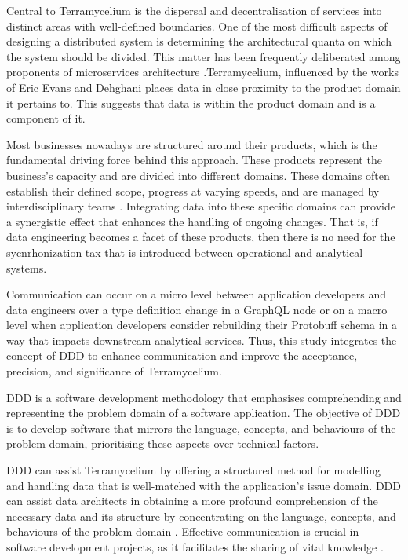 \documentclass{ieeeaccess}
\begin{document}
Central to Terramycelium is the dispersal and decentralisation of services into distinct areas with well-defined boundaries. One of the most difficult aspects of designing a distributed system is determining the architectural quanta on which the system should be divided. This matter has been frequently deliberated among proponents of microservices architecture \cite{merson2020modeling}.Terramycelium, influenced by the works of Eric Evans \cite{evans2004domain} and Dehghani \cite{DataMesh} places data in close proximity to the product domain it pertains to. This suggests that data is within the product domain and is a component of it.

Most businesses nowadays are structured around their products, which is the fundamental driving force behind this approach. These products represent the business's capacity and are divided into different domains. These domains often establish their defined scope, progress at varying speeds, and are managed by interdisciplinary teams \cite{teamtopologiesSkelton}. Integrating data into these specific domains can provide a synergistic effect that enhances the handling of ongoing changes. That is, if data engineering becomes a facet of these products, then there is no need for the sycnrhonization tax that is introduced between operational and analytical systems.

Communication can occur on a micro level between application developers and data engineers over a type definition change in a GraphQL node or on a macro level when application developers consider rebuilding their Protobuff schema in a way that impacts downstream analytical services. Thus, this study integrates the concept of DDD to enhance communication and improve the acceptance, precision, and significance of Terramycelium.

DDD is a software development methodology that emphasises comprehending and representing the problem domain of a software application. The objective of DDD is to develop software that mirrors the language, concepts, and behaviours of the problem domain, prioritising these aspects over technical factors. 

DDD can assist Terramycelium by offering a structured method for modelling and handling data that is well-matched with the application's issue domain. DDD can assist data architects in obtaining a more profound comprehension of the necessary data and its structure by concentrating on the language, concepts, and behaviours of the problem domain \cite{DataMesh}. Effective communication is crucial in software development projects, as it facilitates the sharing of vital knowledge \cite{sudhakar2012model}. 
\end{document}
